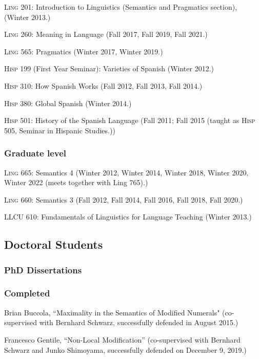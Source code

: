 \documentclass[11pt]{article}
\begin{document}
\textsc{Ling} 201: Introduction to Linguistics (Semantics and Pragmatics
section), (Winter 2013.)

\textsc{Ling} 260: Meaning in Language (Fall 2017, Fall 2019, Fall 2021.)

\textsc{Ling} 565: Pragmatics (Winter 2017, Winter 2019.)

\textsc{Hisp} 199 (First Year Seminar): Varieties of Spanish (Winter 2012.)

\textsc{Hisp} 310: How Spanish Works (Fall 2012, Fall 2013, Fall 2014.)

\textsc{Hisp} 380: Global Spanish (Winter 2014.)

\textsc{Hisp} 501: History of the Spanish Language (Fall 2011; Fall 2015 (taught as \textsc{Hisp} 505, Seminar in Hispanic Studies.))



\subsubsection*{Graduate level}

\textsc{Ling} 665: Semantics 4 (Winter 2012, Winter 2014, Winter 2018, Winter 2020, Winter 2022 (meets together with
Ling 765).)

\textsc{Ling} 660: Semantics 3 (Fall 2012, Fall 2014, Fall 2016, Fall 2018, Fall 2020.)

LLCU 610: Fundamentals of Linguistics for Language Teaching (Winter 2013.)


\subsection*{Doctoral Students}


\subsubsection*{PhD Dissertations}


\subsubsection*{Completed}

Brian Buccola, ``Maximality in the Semantics of Modified Numerals" (co-supervised with Bernhard Schwarz, successfully defended in August 2015.)

Francesco Gentile, ``Non-Local Modification'' (co-supervised with Bernhard Schwarz and Junko Shimoyama, successfully defended on December 9, 2019.)
\end{document}
